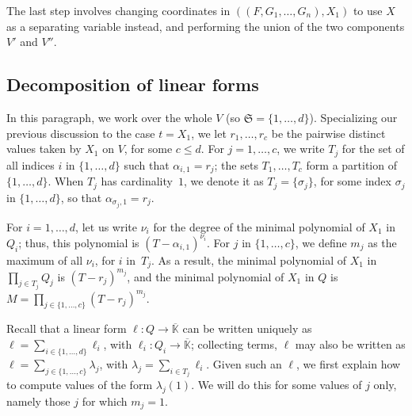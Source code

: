 \documentclass[12pt]{article}
\newcommand{\lf}{X}
\def\Kbar {{\ensuremath{\overline{\mathbb{K}}}}}
\begin{document}
The last step involves changing coordinates in
$((F,G_1,\dots,G_n),X_1)$ to use $\lf$ as a separating variable
instead, and performing the union of the two components $V'$ and
$V''$.


\subsection{Decomposition of linear forms}

In this paragraph, we work over the whole $V$ (so
$\mathfrak{S}=\{1,\dots,d\}$).  Specializing our previous discussion
to the case $t=X_1$, we let $r_1,\dots,r_c$ be the pairwise distinct
values taken by $X_1$ on $V$, for some $c \le d$.  For
$j=1,\dots,c$, we write $T_j$ for the set of all indices $i$ in
$\{1,\dots,d\}$ such that $\alpha_{i,1}=r_j$; the sets $T_1,\dots,T_c$
form a partition of $\{1,\dots,d\}$. When $T_j$ has cardinality~$1$,
we denote it as $T_j=\{\sigma_j\}$, for some index $\sigma_j$ in
$\{1,\dots,d\}$, so that $\alpha_{\sigma_j,1}=r_j$.

For $i=1,\dots,d$, let us write $\nu_i$ for the degree of the minimal
polynomial of $X_1$ in $Q_i$; thus, this polynomial is
$(T-\alpha_{i,1})^{\nu_i}$. For $j$ in $\{1,\dots,c\}$, we define
$m_j$ as the maximum of all $\nu_i$, for $i$ in~$T_j$. As a result, the minimal
polynomial of $X_1$ in $\prod_{j \in T_j} Q_j$ is 
$(T-r_j)^{m_j}$, and the minimal polynomial of $X_1$ in $Q$ is
$M=\prod_{j \in \{1,\dots,c\}} (T-r_j)^{m_j}$.

Recall that a linear form $\ell: Q \to \Kbar$ can be written uniquely
as $\ell=\sum_{i\in \{1,\dots,d\}} \ell_i$, with $\ell_i:Q_i \to
\Kbar$; collecting terms, $\ell$ may also be written as $\ell=\sum_{j
	\in \{1,\dots,c\}} \lambda_j$, with $\lambda_j=\sum_{i \in T_j}
\ell_i$.  Given such an $\ell$, we first explain how to compute values
of the form $\lambda_j(1)$. We will do this for some values of $j$
only, namely those $j$ for which $m_j=1$.
\end{document}
